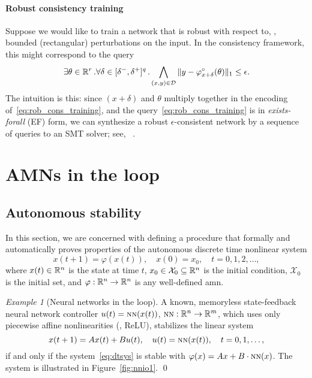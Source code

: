 \documentclass[10pt]{article}
\newcommand{\nn}{\mbox{\sc nn}}
\newcommand{\amn}{\varphi}
\theoremstyle{remark}
\newtheorem{example}{Example}
\theoremstyle{definition}
\theoremstyle{plain}
\begin{document}
\paragraph{Robust consistency training}
Suppose we would like to train a network that is robust with respect to, \eg,
bounded (rectangular) perturbations on the input. In the consistency framework,
this might correspond to the query
\begin{equation}
	\label{eq:rob_cons_training}
	\exists \theta\in\reals^r\, . 
	\forall \delta\in[\delta^-,\delta^+]^q\, .
	\bigwedge_{(x,y)\in\mathcal{D}} 
		\|y - \amn_{x+\delta}^\circ(\theta)\|_1 \leq \epsilon.
\end{equation}
The intuition is this: since $(x+\delta)$ and $\theta$ multiply together in the
encoding
of~\eqref{eq:rob_cons_training}, and the query~\eqref{eq:rob_cons_training} is
in \emph{exists-forall} (EF) form, we can synthesize a robust
$\epsilon$-consistent network by a sequence of queries to an SMT solver; see,
\eg~\cite{Cheng:2013}.



\clearpage
\section{AMNs in the loop}\label{sec:inloop}
\subsection{Autonomous stability}\label{sec:autonomous_stability}
In this section, we are concerned with defining a procedure that formally and
automatically proves properties of the autonomous discrete time nonlinear
system
\begin{equation}
	\label{eq:dtsys}
	x(t+1) = \amn(x(t)), 
	\quad x(0) = x_0,
	\quad t=0,1,2,\ldots,
\end{equation}
where $x(t)\in\mathbb{R}^n$ is the state at time $t$,
$x_0\in\mathcal{X}_0\subseteq\mathbb{R}^n$ is the initial condition, $\mathcal{X}_0$ is
the initial set, and $\amn:\reals^n\to\reals^n$ is any well-defined \acs{amn}. 

\begin{example}[Neural networks in the loop]
A known, memoryless state-feedback neural network controller $u(t) =
\nn(x(t))$, $\nn : \reals^{n} \to \reals^{m}$, which uses only piecewise affine
nonlinearities (\eg, ReLU), stabilizes the linear system
\begin{equation}
	x(t+1) = Ax(t) + Bu(t), 
	\quad u(t) = \nn(x(t)), \quad t = 0,1,\ldots,
\end{equation}
if and only if the system~\eqref{eq:dtsys} is stable
with $\amn(x) = Ax + B\cdot\nn(x)$.
The system is illustrated in Figure~\ref{fig:nnio1}.
\qed
\end{example}
\end{document}
